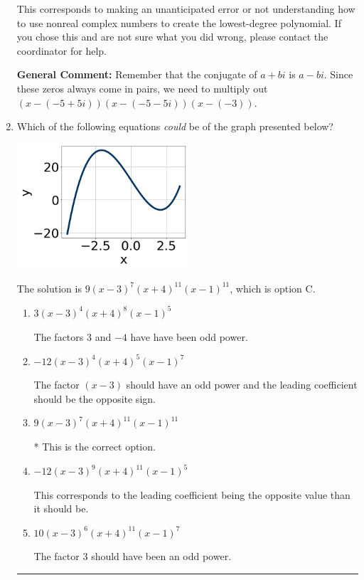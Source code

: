 \documentclass{extbook}[14pt]
\newcommand{\litem}[1]{\item #1

\rule{\textwidth}{0.4pt}}
\begin{document}
\begin{enumerate}
{\begin{enumerate}[label=\Alph*.]
This corresponds to making an unanticipated error or not understanding how to use nonreal complex numbers to create the lowest-degree polynomial. If you chose this and are not sure what you did wrong, please contact the coordinator for help.
\end{enumerate}

\textbf{General Comment:} Remember that the conjugate of $a+bi$ is $a-bi$. Since these zeros always come in pairs, we need to multiply out $(x-(-5 + 5 i))(x-(-5 - 5 i))(x-(-3))$.
}
\litem{
Which of the following equations \textit{could} be of the graph presented below?

\begin{center}
    \includegraphics[width=0.5\textwidth]{../Figures/polyGraphToFunctionCopyB.png}
\end{center}


The solution is \( 9(x - 3)^{7} (x + 4)^{11} (x - 1)^{11} \), which is option C.\begin{enumerate}[label=\Alph*.]
\item \( 3(x - 3)^{4} (x + 4)^{8} (x - 1)^{5} \)

The factors $3$ and $-4$ have have been odd power.
\item \( -12(x - 3)^{4} (x + 4)^{5} (x - 1)^{7} \)

The factor $(x - 3)$ should have an odd power and the leading coefficient should be the opposite sign.
\item \( 9(x - 3)^{7} (x + 4)^{11} (x - 1)^{11} \)

* This is the correct option.
\item \( -12(x - 3)^{9} (x + 4)^{11} (x - 1)^{5} \)

This corresponds to the leading coefficient being the opposite value than it should be.
\item \( 10(x - 3)^{6} (x + 4)^{11} (x - 1)^{7} \)

The factor $3$ should have been an odd power.
\end{enumerate}

}
\end{enumerate}
\end{document}
